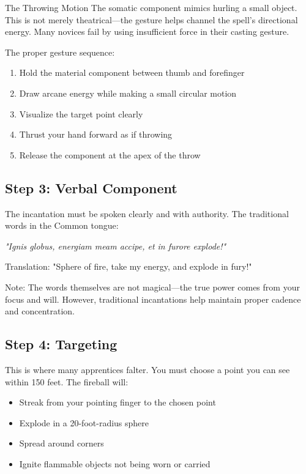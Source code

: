 \documentclass[letterpaper,twocolumn,openany]{dndbook}
\begin{document}
\begin{DndComment}{The Throwing Motion}
    The somatic component mimics hurling a small object. This is not merely theatrical—the gesture helps channel the spell's directional energy. Many novices fail by using insufficient force in their casting gesture.
\end{DndComment}

The proper gesture sequence:

\begin{enumerate}
    \item Hold the material component between thumb and forefinger
    \item Draw arcane energy while making a small circular motion
    \item Visualize the target point clearly
    \item Thrust your hand forward as if throwing
    \item Release the component at the apex of the throw
\end{enumerate}

\subsection{Step 3: Verbal Component}

The incantation must be spoken clearly and with authority. The traditional words in the Common tongue:

\begin{center}
    \emph{"Ignis globus, energiam meam accipe, et in furore explode!"}
\end{center}

Translation: "Sphere of fire, take my energy, and explode in fury!"

\begin{DndReadAloud}
    Note: The words themselves are not magical—the true power comes from your focus and will. However, traditional incantations help maintain proper cadence and concentration.
\end{DndReadAloud}

\subsection{Step 4: Targeting}

This is where many apprentices falter. You must choose a point you can see within 150 feet. The fireball will:

\begin{itemize}
    \item Streak from your pointing finger to the chosen point
    \item Explode in a 20-foot-radius sphere
    \item Spread around corners
    \item Ignite flammable objects not being worn or carried
\end{itemize}
\end{document}
